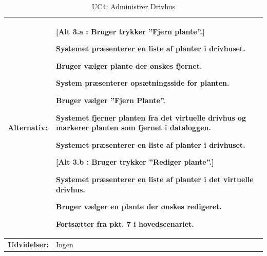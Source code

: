 \begin{table}[h]
\begin{tabularx}{\textwidth}{| >{\raggedright\arraybackslash}p{3.3 cm} | >{\raggedright\arraybackslash}X |}
\textbf{Alternativ:}				& 
\textbf{{[}Alt 3.a : Bruger trykker ”Fjern plante”.{]}}
\begin{packed_enum}
\setcounter{enumi}{3}
\item Systemet præsenterer en liste af planter i drivhuset.
\item Bruger vælger plante der ønskes fjernet.
\item System præsenterer opsætningsside for planten.
\item Bruger vælger ”Fjern Plante”.
\item Systemet fjerner planten fra det virtuelle drivhus og markerer planten som fjernet i dataloggen.
\item Systemet præsenterer en liste af planter i drivhuset.
\end{packed_enum}
\textbf{{[}Alt 3.b : Bruger trykker ”Rediger plante”.{]}}
\begin{packed_enum}
\setcounter{enumi}{3}
\item Systemet præsenterer en liste af planter i det virtuelle drivhus.
\item Bruger vælger en plante der ønskes redigeret.
\item Fortsætter fra pkt. 7 i hovedscenariet.
\end{packed_enum}
\\ \hline

\textbf{Udvidelser:}				&  
Ingen
\\ \hline
\end{tabularx}
\caption{UC4: Administrer Drivhus}
\label{tbl:UC4}
\end{table}

\clearpage

